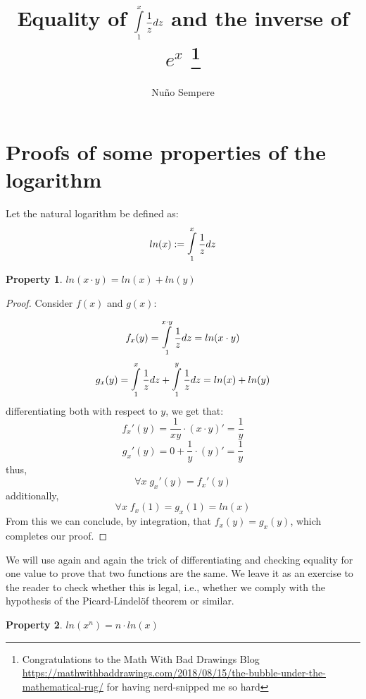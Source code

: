 \documentclass[12pt,oneside,a4paper]{article}
\newtheorem{property}{Property}
\begin{document}
\title{Equality of $\displaystyle \mathop{\mathlarger{\mathlarger{\int}}}_{1}^{x} \frac{1}{z} dz 
$ and the inverse of $e^x$
\footnote{Congratulations to the Math With Bad Drawings Blog \url{https://mathwithbaddrawings.com/2018/08/15/the-bubble-under-the-mathematical-rug/} for having nerd-snipped me so hard}} 
\date{} %
\author{Nu\~{n}o Sempere}
\maketitle

\section{Proofs of some properties of the logarithm}
Let the natural logarithm be defined as:
\begin{equation}
ln(x) := \mathop{\mathlarger{\mathlarger{\int}}}_{1}^{x} \frac{1}{z} dz 
\end{equation}

\begin{property}
$ln(x \cdot y) = ln(x) + ln(y)$
\end{property}
\begin{proof}
Consider $f(x)$ and $g(x)$:

\begin{equation}
f_x(y)= \mathop{\mathlarger{\mathlarger{\int}}}_{1}^{x \cdot y} \frac{1}{z} dz
= ln(x \cdot y)
\end{equation}
\begin{equation}
g_x(y)= \mathop{\mathlarger{\mathlarger{\int}}}_{1}^{x} \frac{1}{z} dz + \mathop{\mathlarger{\mathlarger{\int}}}_{1}^{y} \frac{1}{z} dz
= ln(x) + ln(y)
\end{equation}
differentiating both with respect to $y$, we get that:
\begin{equation}
f_x'(y)= \frac{1}{xy} \cdot (x \cdot y)' = \frac{1}{y}
\end{equation}
\begin{equation}
g_x'(y)= 0+\frac{1}{y} \cdot (y)' = \frac{1}{y}
\end{equation}
thus, 
\begin{equation}
\forall x \; g_x'(y) = f_x'(y) 
\end{equation}
additionally,
\begin{equation}
\forall x \; f_x(1) = g_x(1) = ln(x)
\end{equation}
From this we can conclude, by integration, that $f_x(y) = g_x(y)$, which completes our proof.
\end{proof}
\par \noindent
We will use again and again the trick of differentiating and checking equality for one value to prove that two functions are the same. We leave it as an exercise to the reader to check whether this is legal, i.e., whether we comply with the hypothesis of the Picard-Lindel{\"o}f theorem or similar.
\newpage
\begin{property}
$ln(x ^n) = n \cdot ln(x)$
\end{property}
\end{document}
